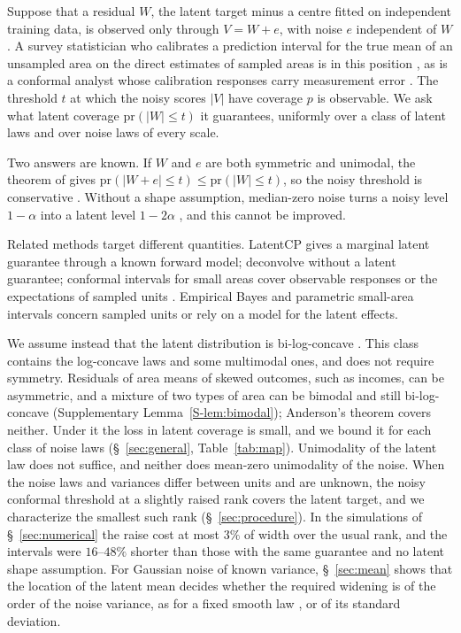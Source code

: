 \documentclass[lineno]{biometrika}
\newcommand{\pr}{\mathrm{pr}}
\begin{document}
Suppose that a residual $W$, the latent target minus a centre fitted on independent training data, is observed only through $V = W + e$, with noise $e$ independent of $W$. A survey statistician who calibrates a prediction interval for the true mean of an unsampled area on the direct estimates of sampled areas is in this position \citep{fay1979}, as is a conformal analyst whose calibration responses carry measurement error \citep{einbinder2024, cohen2025}. The threshold $t$ at which the noisy scores $|V|$ have coverage $p$ is observable. We ask what latent coverage $\pr(|W| \le t)$ it guarantees, uniformly over a class of latent laws and over noise laws of every scale.

Two answers are known. If $W$ and $e$ are both symmetric and unimodal, the theorem of \citet{anderson1955} gives $\pr(|W + e| \le t) \le \pr(|W| \le t)$, so the noisy threshold is conservative \citep{einbinder2024}. Without a shape assumption, median-zero noise turns a noisy level $1 - \alpha$ into a latent level $1 - 2\alpha$ \citep{guille2024}, and this cannot be improved.

Related methods target different quantities. LatentCP \citep{zheng2026} gives a marginal latent guarantee through a known forward model; \citet{cohen2025} deconvolve without a latent guarantee; conformal intervals for small areas cover observable responses \citep{bersson2024} or the expectations of sampled units \citep{zhang2026}. Empirical Bayes and parametric small-area intervals \citep{armstrong2022, ignatiadis2022, hallmaiti2006, yoshimori2014} concern sampled units or rely on a model for the latent effects.

We assume instead that the latent distribution is bi-log-concave \citep{dumbgen2017}. This class contains the log-concave laws and some multimodal ones, and does not require symmetry. Residuals of area means of skewed outcomes, such as incomes, can be asymmetric, and a mixture of two types of area can be bimodal and still bi-log-concave (Supplementary Lemma~\ref{S-lem:bimodal}); Anderson's theorem covers neither. Under it the loss in latent coverage is small, and we bound it for each class of noise laws (\S~\ref{sec:general}, Table~\ref{tab:map}). Unimodality of the latent law does not suffice, and neither does mean-zero unimodality of the noise. When the noise laws and variances differ between units and are unknown, the noisy conformal threshold at a slightly raised rank covers the latent target, and we characterize the smallest such rank (\S~\ref{sec:procedure}). In the simulations of \S~\ref{sec:numerical} the raise cost at most $3\%$ of width over the usual rank, and the intervals were $16$--$48\%$ shorter than those with the same guarantee and no latent shape assumption. For Gaussian noise of known variance, \S~\ref{sec:mean} shows that the location of the latent mean decides whether the required widening is of the order of the noise variance, as for a fixed smooth law \citep{jochmans2024}, or of its standard deviation.
\end{document}
